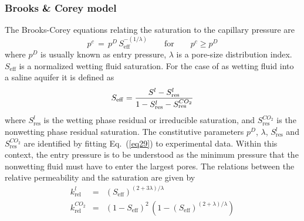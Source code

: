 \subsubsection*{Brooks \& Corey model \cite{BroCor:64}}

The Brooks-Corey equations relating the saturation to the capillary pressure are
\begin{equation}
p^c\,=\,p^D\,S_{\mathrm{eff}}^{-(1/\lambda)}
\qquad\mbox{for}\qquad p^c\geq p^D
\label{eq29}
\end{equation}
where $p^D$ is usually known as entry pressure, $\lambda$ is a pore-size distribution index.
%
$S_{\mathrm{eff}}$ is a normalized wetting fluid saturation. For the case of  as wetting fluid into a saline aquifer it is defined as
\begin{equation}
S_{\mathrm{eff}}=\frac{S^{l}-S^l_{\mathrm{res}}}{1-S^l_{\mathrm{res}}-S^{CO_2}_{\mathrm{res}}} \\
\label{eq30}
\end{equation}
where $S^l_{\mathrm{res}}$ is the wetting phase residual or irreducible saturation, and $S^{CO_2}_{\mathrm{res}}$ is the nonwetting phase residual saturation. The constitutive parameters $p^D$, $\lambda$, $S^l_{\mathrm{res}}$ and $S^{CO_2}_{\mathrm{res}}$ are identified by fitting Eq.~(\ref{eq29}) to experimental data. Within this context, the entry pressure is to be understood as the minimum pressure that the nonwetting fluid must have to enter the largest pores. The relations between the relative permeability and the saturation are given by
\begin{eqnarray}
k_{\mathrm{rel}}^{l} & = & \left(S_{\mathrm{eff}}\right)^{(2+3\lambda)/\lambda}
\label{eq31} \\[2.0ex]
k_{\mathrm{rel}}^{CO_2} & = & \left(1-S_{\mathrm{eff}}\right)^2\,\left(1-\left(S_{\mathrm{eff}}\right)^{(2+\lambda)/\lambda}\right)
\label{eq32}
\end{eqnarray}


